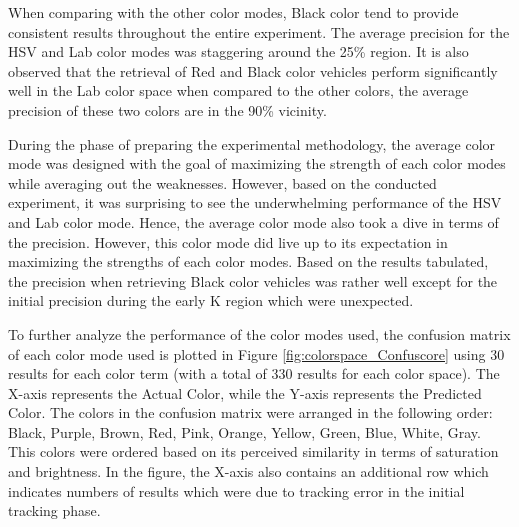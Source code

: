 When comparing with the other color modes, Black color tend to provide consistent results throughout the entire experiment. The average precision for the HSV and Lab color modes was staggering around the 25\% region. It is also observed that the retrieval of Red and Black color vehicles perform significantly well in the Lab color space when compared to the other colors, the average precision of these two colors are in the 90\% vicinity. 

During the phase of preparing the experimental methodology, the average color mode was designed with the goal of maximizing the strength of each color modes while averaging out the weaknesses. However, based on the conducted experiment, it was surprising to see the underwhelming performance of the HSV and Lab color mode. Hence, the average color mode also took a dive in terms of the precision. However, this color mode did live up to its expectation in maximizing the strengths of each color modes. Based on the results tabulated, the precision when retrieving Black color vehicles was rather well except for the initial precision during the early K region which were unexpected. 

To further analyze the performance of the color modes used, the confusion matrix of each color mode used is plotted in Figure \ref{fig:colorspace_Confuscore} using 30 results for each color term (with a total of 330 results for each color space). The X-axis represents the Actual Color, while the Y-axis represents the Predicted Color. The colors in the confusion matrix were arranged in the following order: Black, Purple, Brown, Red, Pink, Orange, Yellow, Green, Blue, White, Gray. This colors were ordered based on its perceived similarity in terms of saturation and brightness. In the figure, the X-axis also contains an additional row which indicates numbers of results which were due to tracking error in the initial tracking  phase.

